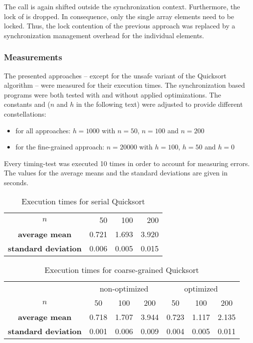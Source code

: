 The call  is again shifted outside the synchronization context. Furthermore, the lock of  is dropped. In consequence, only the single array elements need to be locked. Thus, the lock contention of the previous approach was replaced by a synchronization management overhead for the individual elements.

\subsubsection{Measurements}
The presented approaches -- except for the unsafe variant of the Quicksort algorithm -- were measured for their execution times. The synchronization based programs were both tested with and without applied optimizations. The constants  and  ($n$ and $h$ in the following text) were adjusted to provide different constellations:
\begin{itemize}
\item for all approaches: $h = 1000$ with $n = 50$, $n = 100$ and $n = 200$
\item for the fine-grained approach: $n = 20000$ with $h = 100$, $h = 50$ and $h = 0$
\end{itemize}
Every timing-test was executed 10 times in order to account for measuring errors. The values for the average means and the standard deviations are given in seconds.

\begin{table}[h!]
\begin{center}
\begin{tabular}{ c| r|r|r|}
\cline{2-4} $n$ & 50 & 100 & 200 \\ 
\cline{2-4} \textbf{average mean} & 0.721 & 1.693 & 3.920 \\ 
\cline{2-4} \textbf{standard deviation} & 0.006 & 0.005 & 0.015 \\ 
\cline{2-4}
\end{tabular} 
\caption{Execution times for serial Quicksort}
\label{table:serial_quicksort}
\end{center}
\end{table}


\begin{table}[h!]
\begin{center}
\begin{tabular}{c |c|c|c||c|c|c|}
  \multicolumn{1}{c}{} & \multicolumn{3}{c}{non-optimized} & \multicolumn{3}{c}{optimized}\\ \cline{2-7}
  $n$ & 50 & 100 & 200 & 50 & 100 & 200\\ \cline{2-7}
  \textbf{average mean} & 0.718 & 1.707 & 3.944 & 0.723 & 1.117 & 2.135	\\ \cline{2-7}
  \textbf{standard deviation} & 0.001 & 0.006 & 0.009 & 0.004 & 0.005 & 0.011\\ \cline{2-7}
\end{tabular}
\caption{Execution times for coarse-grained Quicksort}
\label{table:coarse_quicksort}
\end{center}
\end{table}

